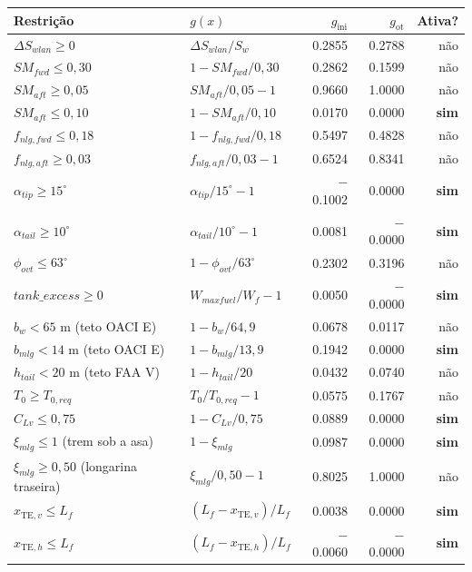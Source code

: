 \begin{tabular}{llrrr}
\toprule
Restrição & $g(x)$ & $g_{\mathrm{ini}}$ & $g_{\mathrm{ot}}$ & Ativa? \\
\midrule
$\Delta S_{wlan} \geq 0$ & $\Delta S_{wlan}/S_w$ & 0.2855 & 0.2788 & não \\
$SM_{fwd} \leq 0{,}30$ & $1 - SM_{fwd}/0{,}30$ & 0.2862 & 0.1599 & não \\
$SM_{aft} \geq 0{,}05$ & $SM_{aft}/0{,}05 - 1$ & 0.9660 & 1.0000 & não \\
$SM_{aft} \leq 0{,}10$ & $1 - SM_{aft}/0{,}10$ & 0.0170 & 0.0000 & \textbf{sim} \\
$f_{nlg,fwd} \leq 0{,}18$ & $1 - f_{nlg,fwd}/0{,}18$ & 0.5497 & 0.4828 & não \\
$f_{nlg,aft} \geq 0{,}03$ & $f_{nlg,aft}/0{,}03 - 1$ & 0.6524 & 0.8341 & não \\
$\alpha_{tip} \geq 15^\circ$ & $\alpha_{tip}/15^\circ - 1$ & $-$0.1002 & 0.0000 & \textbf{sim} \\
$\alpha_{tail} \geq 10^\circ$ & $\alpha_{tail}/10^\circ - 1$ & 0.0081 & $-$0.0000 & \textbf{sim} \\
$\phi_{ovt} \leq 63^\circ$ & $1 - \phi_{ovt}/63^\circ$ & 0.2302 & 0.3196 & não \\
$tank\_excess \geq 0$ & $W_{maxfuel}/W_f - 1$ & 0.0050 & $-$0.0000 & \textbf{sim} \\
$b_w < 65$ m (teto OACI E) & $1 - b_w/64{,}9$ & 0.0678 & 0.0117 & não \\
$b_{mlg} < 14$ m (teto OACI E) & $1 - b_{mlg}/13{,}9$ & 0.1942 & 0.0000 & \textbf{sim} \\
$h_{tail} < 20$ m (teto FAA V) & $1 - h_{tail}/20$ & 0.0432 & 0.0740 & não \\
$T_0 \geq T_{0,req}$ & $T_0/T_{0,req} - 1$ & 0.0575 & 0.1767 & não \\
$C_{Lv} \leq 0{,}75$ & $1 - C_{Lv}/0{,}75$ & 0.0889 & 0.0000 & \textbf{sim} \\
$\xi_{mlg} \leq 1$ (trem sob a asa) & $1 - \xi_{mlg}$ & 0.0987 & 0.0000 & \textbf{sim} \\
$\xi_{mlg} \geq 0{,}50$ (longarina traseira) & $\xi_{mlg}/0{,}50 - 1$ & 0.8025 & 1.0000 & não \\
$x_{\mathrm{TE},v} \leq L_f$ & $(L_f - x_{\mathrm{TE},v})/L_f$ & 0.0038 & 0.0000 & \textbf{sim} \\
$x_{\mathrm{TE},h} \leq L_f$ & $(L_f - x_{\mathrm{TE},h})/L_f$ & $-$0.0060 & $-$0.0000 & \textbf{sim} \\
\bottomrule
\end{tabular}